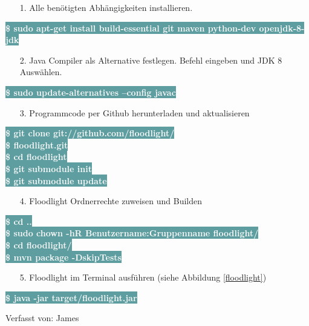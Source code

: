 \documentclass[fontsize=12pt,paper=a4,open=any,parskip=half,
  twoside=false,toc=listof,toc=bibliography,fleqn,leqno,
  captions=nooneline,captions=tableabove,british]{scrbook}
\begin{document}
\begin{itemize}
\item[1.] Alle benötigten Abhängigkeiten installieren.
\end{itemize}
\colorbox{CadetBlue}{\textcolor{white}{\textbf{\textsf{\$ sudo apt-get install build-essential git maven python-dev openjdk-8-jdk}}}}
\begin{itemize}
\item[2.] Java Compiler als Alternative festlegen. Befehl eingeben und JDK 8 Auswählen.
\end{itemize}
\colorbox{CadetBlue}{\textcolor{white}{\textbf{\textsf{\$ sudo update-alternatives --config javac}}}}
\begin{itemize}
\item[3.] Programmcode per Github herunterladen und aktualisieren
\end{itemize}
\colorbox{CadetBlue}{\textcolor{white}{\textbf{\textsf{\$ git clone git://github.com/floodlight/}}}}\\
\colorbox{CadetBlue}{\textcolor{white}{\textbf{\textsf{\$ floodlight.git}}}}\\
\colorbox{CadetBlue}{\textcolor{white}{\textbf{\textsf{\$ cd floodlight}}}}\\
\colorbox{CadetBlue}{\textcolor{white}{\textbf{\textsf{\$ git submodule init}}}}\\
\colorbox{CadetBlue}{\textcolor{white}{\textbf{\textsf{\$ git submodule update}}}}
\begin{itemize}
\item[4.] Floodlight Ordnerrechte zuweisen und Builden
\end{itemize}
\colorbox{CadetBlue}{\textcolor{white}{\textbf{\textsf{\$ cd ..}}}}\\
\colorbox{CadetBlue}{\textcolor{white}{\textbf{\textsf{\$ sudo chown -hR Benutzername:Gruppenname floodlight/}}}}\\
\colorbox{CadetBlue}{\textcolor{white}{\textbf{\textsf{\$ cd floodlight/}}}}\\
\colorbox{CadetBlue}{\textcolor{white}{\textbf{\textsf{\$ mvn package -DskipTests}}}}
\begin{itemize}
\item[5.] Floodlight im Terminal ausführen (siehe Abbildung \ref{floodlight})
\end{itemize}
\colorbox{CadetBlue}{\textcolor{white}{\textbf{\textsf{\$ java -jar target/floodlight.jar}}}}\par
{\tiny Verfasst von: James\par}
\end{document}

